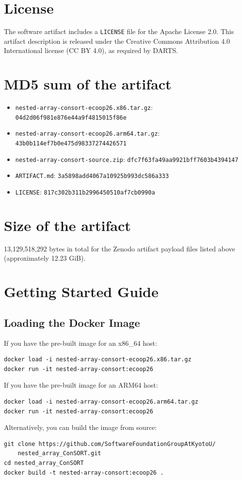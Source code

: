 \documentclass[a4paper,USenglish]{darts-v2021}
\newcommand{\license}[1]{{\section{License}#1}}
\newcommand{\mdsum}[1]{{\section{MD5 sum of the artifact}#1}}
\newcommand{\artifactsize}[1]{{\section{Size of the artifact}#1}}
\begin{document}
\license{The software artifact includes a \texttt{LICENSE} file for the Apache License 2.0.
This artifact description is released under the Creative Commons Attribution 4.0
International license (CC BY 4.0), as required by DARTS.}

\mdsum{
\begin{itemize}
  \item \texttt{nested-array-consort-ecoop26.x86.tar.gz}: \texttt{04d2d06f981e876e44a9f4815015f86e}
  \item \texttt{nested-array-consort-ecoop26.arm64.tar.gz}: \texttt{43b0b114ef7b0e475d98337274426571}
  \item \texttt{nested-array-consort-source.zip}: \texttt{dfc7f63fa49aa9921bff7603b4394147}
  \item \texttt{ARTIFACT.md}: \texttt{3a5898add4067a10925b993dc586a333}
  \item \texttt{LICENSE}: \texttt{817c302b311b2996450510af7cb0990a}
\end{itemize}
}

\artifactsize{13,129,518,292 bytes in total for the Zenodo artifact payload files
listed above (approximately 12.23 GiB).}

\appendix


\section{Getting Started Guide}

\subsection{Loading the Docker Image}

If you have the pre-built image for an x86\_64 host:

\begin{verbatim}
docker load -i nested-array-consort-ecoop26.x86.tar.gz
docker run -it nested-array-consort:ecoop26
\end{verbatim}

If you have the pre-built image for an ARM64 host:

\begin{verbatim}
docker load -i nested-array-consort-ecoop26.arm64.tar.gz
docker run -it nested-array-consort:ecoop26
\end{verbatim}

Alternatively, you can build the image from source:

\begin{verbatim}
git clone https://github.com/SoftwareFoundationGroupAtKyotoU/
    nested_array_ConSORT.git
cd nested_array_ConSORT
docker build -t nested-array-consort:ecoop26 .
\end{verbatim}
\end{document}
